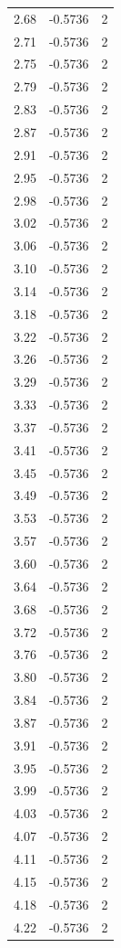 \begin{longtable}{lrr}
  2.68 & -0.5736 & 2 \\
  2.71 & -0.5736 & 2 \\
  2.75 & -0.5736 & 2 \\
  2.79 & -0.5736 & 2 \\
  2.83 & -0.5736 & 2 \\
  2.87 & -0.5736 & 2 \\
  2.91 & -0.5736 & 2 \\
  2.95 & -0.5736 & 2 \\
  2.98 & -0.5736 & 2 \\
  3.02 & -0.5736 & 2 \\
  3.06 & -0.5736 & 2 \\
  3.10 & -0.5736 & 2 \\
  3.14 & -0.5736 & 2 \\
  3.18 & -0.5736 & 2 \\
  3.22 & -0.5736 & 2 \\
  3.26 & -0.5736 & 2 \\
  3.29 & -0.5736 & 2 \\
  3.33 & -0.5736 & 2 \\
  3.37 & -0.5736 & 2 \\
  3.41 & -0.5736 & 2 \\
  3.45 & -0.5736 & 2 \\
  3.49 & -0.5736 & 2 \\
  3.53 & -0.5736 & 2 \\
  3.57 & -0.5736 & 2 \\
  3.60 & -0.5736 & 2 \\
  3.64 & -0.5736 & 2 \\
  3.68 & -0.5736 & 2 \\
  3.72 & -0.5736 & 2 \\
  3.76 & -0.5736 & 2 \\
  3.80 & -0.5736 & 2 \\
  3.84 & -0.5736 & 2 \\
  3.87 & -0.5736 & 2 \\
  3.91 & -0.5736 & 2 \\
  3.95 & -0.5736 & 2 \\
  3.99 & -0.5736 & 2 \\
  4.03 & -0.5736 & 2 \\
  4.07 & -0.5736 & 2 \\
  4.11 & -0.5736 & 2 \\
  4.15 & -0.5736 & 2 \\
  4.18 & -0.5736 & 2 \\
  4.22 & -0.5736 & 2 \\

\end{longtable}
